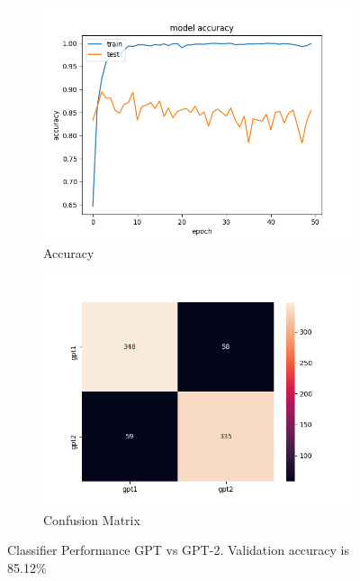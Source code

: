 \documentclass[11pt,letterpaper]{article}
\begin{document}
\begin{figure}[h!]
        \centering
        \begin{subfigure}[b]{1.0\linewidth}
                \centering
                \includegraphics[width=0.7\linewidth]{accuracy_epochs_gpt1_gpt2.png}
                \caption{Accuracy}
        \end{subfigure}
        \begin{subfigure}[b]{1.0\linewidth}
                \centering
                \includegraphics[width=0.7\linewidth]{sns_heatmap_gpt1_gpt2.png}
                \caption{Confusion Matrix}
        \end{subfigure}
        \caption{Classifier Performance GPT vs GPT-2. Validation accuracy is 85.12\%}
        \label{fig:prob6.1}
\end{figure}
\end{document}
